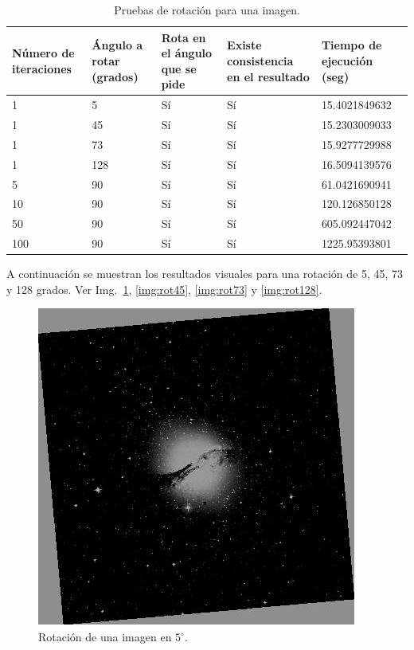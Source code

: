 \begin{table}
	\centering
	\begin{tabular}{p{1in}|p{1in}|p{1in}|p{1in}|p{1in}}
		Número de iteraciones & Ángulo a rotar (grados) & Rota en el ángulo que se pide & Existe consistencia en el resultado & Tiempo de ejecución (seg) \\\hline\hline
		1   & 5   & Sí & Sí & 15.4021849632 \\\hline
		1   & 45  & Sí & Sí & 15.2303009033 \\\hline
		1   & 73  & Sí & Sí & 15.9277729988 \\\hline
		1   & 128 & Sí & Sí & 16.5094139576 \\\hline
		5   & 90  & Sí & Sí & 61.0421690941 \\\hline
		10  & 90  & Sí & Sí & 120.126850128 \\\hline
		50  & 90  & Sí & Sí & 605.092447042 \\\hline
		100 & 90  & Sí & Sí & 1225.95393801 \\
	\end{tabular}
	\caption{Pruebas de rotación para una imagen.}
	\label{tab:pr}
\end{table}

A continuación se muestran los resultados visuales para una rotación de 5, 45, 73 y 128 grados. Ver Img.~\ref{img:rot5}, \ref{img:rot45}, \ref{img:rot73} y \ref{img:rot128}.

\begin{figure}[ht!]
	\centering
	\includegraphics[scale=.5]{img/rot5}
	\caption{Rotación de una imagen en $5^\circ$.}
	\label{img:rot5}
\end{figure}

